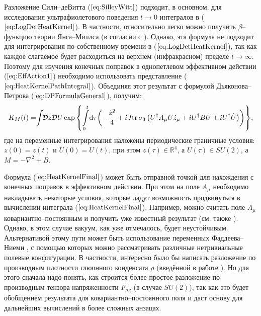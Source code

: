 
Разложение Сили--деВитта ($\ref{eq:SilleyWitt}$) подходит, в основном, для исследования ультрафиолетового поведения $t\to 0$ интегралов в ($\ref{eq:LogDetHeatKernel}$). В частности, относительно легко можно получить $\beta$--функцию теории Янга--Миллса (в согласии с \cite{GrossWilczek1973,Politzer1973}). Однако, эта формула не подходит для интегрирования по собственному времени в ($\ref{eq:LogDetHeatKernel}$), так как каждое слагаемое будет расходиться на верхнем (инфракрасном) пределе $t\to \infty$. Поэтому для изучения конечных поправок в однопетлевом эффективном действии ($\ref{eq:EffAction1}$) необходимо использовать представление ($\ref{eq:HeatKernelPathIntegral}$). Объединяя этот результат с формулой Дьяконова--Петрова ($\ref{eq:DPFormulaGeneral}$), получим:
\begin{equation}
	\label{eq:HeatKernelFinal}
	K_M(t)=\mkern-\thickmuskip\int\mkern-\thickmuskip\mathcal{D}z\mathcal{D}U \exp{\left\{\int\limits_0^t\!\D \tau\!\left( -\frac{\dot{z}^2}{4} + iJ\tr\,\sigma_3\left(U^\dagger A_\mu U\dot{z}_\mu + iU^\dagger BU+iU^\dagger\dot{U}\right) \right)\right\}},
\end{equation}
где на переменные интегрирования наложены периодические граничные условия: $z(0)=z(t)$ и $U(0)=U(t)$, при этом $z(\tau)\in \mathbb{R}^4$, а $U(\tau)\in SU(2)$, а $M=-\nabla^2+B$.

Формула ($\ref{eq:HeatKernelFinal}$) может быть отправной точкой для нахождения с конечных поправок в эффективном действии. При этом на поле $A_\mu$ необходимо накладывать некоторые условия, которые дадут возможность продвинуться в вычислении интеграла ($\ref{eq:HeatKernelFinal}$). Например, можно считать поле $A_\mu$ ковариантно--постоянным и получить уже известный результат \cite{Savvidy1977} (см. также \cite{Mnev}). Однако, в этом случае вакуум, как уже отмечалось, будет неустойчивым. Альтернативой этому пути может быть использование переменных Фаддеева--Ниеми \cite{Faddeev2007}, с помощью которых можно рассматривать различные нетривиальные полевые конфигурации. В частности, интересно было бы написать разложение по производным плотности глюонного конденсата $\rho$ (введённой в работе \cite{Faddeev2007}). Но для этого сначала надо понять, как строится более простое разложение по производным тензора напряженности $F_{\mu \nu}$ (в случае $SU(2)$), так как это будет обобщением результата для ковариантно--постоянного поля и даст основу для дальнейших вычислений в более сложных анзацах.